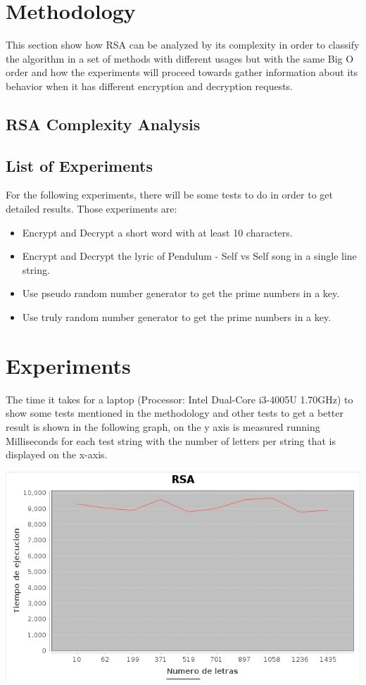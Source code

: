 \documentclass[conference,compsoc, 10pt]{IEEEtran}
\begin{document}
\section{Methodology}
This section show how RSA can be analyzed by its complexity in order to classify the algorithm in a set of methods with different usages but with the same Big O order and how the experiments will proceed towards gather information about its behavior when it has different encryption and decryption requests.

\subsection{RSA Complexity Analysis}


\subsection{List of Experiments}
For the following experiments, there will be some tests to do in order to get detailed results. Those experiments are:



\begin{itemize}
	\item Encrypt and Decrypt a short word with at least 10 characters.
	\item Encrypt and Decrypt the lyric of Pendulum - Self vs Self song in a single line string.
	\item Use pseudo random number generator to get the prime numbers in a key.
	\item Use truly random number generator to get the prime numbers in a key.
\end{itemize}


\section{Experiments}
The time it takes for a laptop (Processor: Intel Dual-Core i3-4005U 1.70GHz) to show some tests mentioned in the methodology and other tests to get a better result is shown in the following graph, on the y axis is measured running Milliseconds for each test string with the number of letters per string that is displayed on the x-axis.

\includegraphics[scale=0.3]{Rsa_definitivo.png}
	
\end{document}
